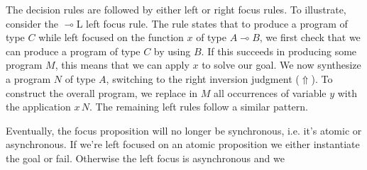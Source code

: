 \documentclass{llncs}
\newcommand{\lolli}{\multimap}
\newcommand{\tensor}{\otimes}
\newcommand{\bang}{{!}}
\begin{document}
  The decision rules are followed by either left or right focus rules.
  To illustrate, consider the $\lolli$L left focus rule. The rule
  states that to produce a program of type $C$ while left focused on
  the function $x$ of type $A\lolli B$, we first check that we can produce a
  program of type $C$ by using $B$. If this succeeds in producing some
  program $M$, this means that we can apply $x$ to solve our
  goal. We now synthesize a program $N$ of type $A$, switching to the
  right inversion judgment ($\Uparrow$). To construct the overall
  program, we replace in $M$ all occurrences of variable $y$ with the
  application $x\,N$. The remaining left rules follow a similar
  pattern. 

%
Eventually, the focus proposition will no longer be synchronous, i.e. it's
atomic or asynchronous. If we're left focused on an atomic proposition we either
instantiate the goal or fail. Otherwise the left focus is asynchronous and we
\end{document}
